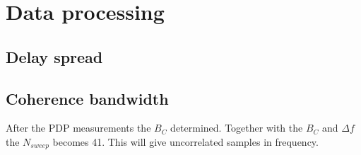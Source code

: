 \section{Data processing}
\subsection{Delay spread}

\subsection{Coherence bandwidth}\label{sec:coherence_bandwidth}
After the PDP measurements the $B_C$ determined. Together with the $B_C$ and $\Delta f$ the $N_{sweep}$ becomes 41. This will give uncorrelated samples in frequency.

